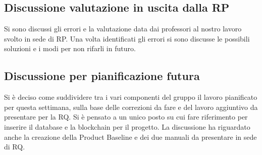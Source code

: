 \subsection*{Discussione valutazione in uscita dalla RP}
Si sono discussi gli errori e la valutazione data dai professori al nostro lavoro svolto in sede di RP. Una volta identificati gli errori si sono discusse le possibili soluzioni e i modi per non rifarli in futuro.
\subsection*{Discussione per pianificazione futura}
Si è deciso come suddividere tra i vari componenti del gruppo il lavoro pianificato per questa settimana, sulla base delle correzioni da fare e del lavoro aggiuntivo da presentare per la RQ.
Si è pensato a un unico posto su cui fare riferimento per inserire il database e la blockchain per il progetto.
La discussione ha riguardato anche la creazione della Product Baseline e dei due manuali da presentare in sede di RQ.